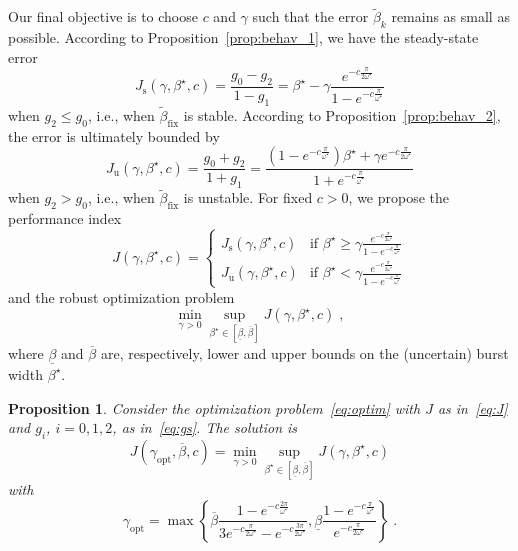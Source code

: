 \documentclass{article}
\newcommand{\rs}{\mathrm{s}}
\newcommand{\ru}{\mathrm{u}}
\newcommand{\opt}{\mathrm{opt}}
\newcommand{\fix}{\mathrm{fix}}
\newtheorem{proposition}{Proposition}
\theoremstyle{definition}
\theoremstyle{remark}
\begin{document}
Our final objective is to choose $c$ and $\gamma$ such that the error $\tilde{\beta}_k$ remains as small as possible. According to Proposition~\ref{prop:behav_1}, we have the steady-state error
\begin{displaymath}
    J_\rs(\gamma,\beta^\star,c) =  \frac{g_0-g_2}{1-g_1} =
      \beta^\star - \gamma\frac{e^{-c\frac{\pi}{2\omega^\star}}}{1 - e^{-c\frac{\pi}{\omega^\star}}}
\end{displaymath}
when $g_2 \le g_0$, i.e., when $\tilde{\beta}_\fix$ is stable. According to Proposition~\ref{prop:behav_2}, the error is ultimately bounded by
\begin{displaymath}
    J_\ru(\gamma,\beta^\star,c) = \frac{g_0+g_2}{1+g_1} =
     \frac{(1 - e^{-c\frac{\pi}{\omega^\star}})\beta^\star + \gamma e^{-c\frac{\pi}{2\omega^\star}}}{1 + e^{-c\frac{\pi}{\omega^\star}}}
\end{displaymath}
when $g_2 > g_0$, i.e., when $\tilde{\beta}_\fix$ is unstable. For fixed $c > 0$, we propose the performance index
\begin{equation} \label{eq:J} 
    J(\gamma,\beta^\star,c) = 
    \begin{cases}
        J_\rs(\gamma,\beta^\star,c) & \text{if $\beta^\star \ge \gamma\frac{e^{-c\frac{\pi}{2\omega^\star}}}{1 - e^{-c\frac{\pi}{\omega^\star}}}$} \\
        J_\ru(\gamma,\beta^\star,c) & \text{if $\beta^\star < \gamma\frac{e^{-c\frac{\pi}{2\omega^\star}}}{1 - e^{-c\frac{\pi}{\omega^\star}}}$}
    \end{cases}
\end{equation}
and the robust optimization problem
\begin{equation} \label{eq:optim}
    \min_{\gamma > 0} \sup_{\beta^\star \in [\underline{\beta}, \overline{\beta}]} J(\gamma,\beta^\star,c) \;,
\end{equation}
where $\underline{\beta}$ and $\overline{\beta}$ are, respectively, lower and upper bounds on the (uncertain) burst width $\beta^\star$.

\begin{proposition} \label{prop:optimization}
    Consider the optimization problem~\eqref{eq:optim} with $J$ as in~\eqref{eq:J} and $g_i$, $i = 0,1,2$, as in~\eqref{eq:gs}. The solution is 
    \begin{displaymath}
        J(\gamma_\opt,\overline{\beta},c) = \min_{\gamma > 0} \sup_{\beta^\star \in [\underline{\beta}, \overline{\beta}]} J(\gamma,\beta^\star,c)
    \end{displaymath}
    with
    \begin{equation} \label{eq:gamma_opt}
        \gamma_{\opt} = \max\left\{\overline{\beta}\frac{1 - e^{-c\frac{2\pi}{\omega^\star}}}{3e^{-c\frac{\pi}{2\omega^\star}} - e^{-c\frac{3\pi}{2\omega^\star}}},\underline{\beta}\frac{1 - e^{-c\frac{\pi}{\omega^\star}}}{e^{-c\frac{\pi}{2\omega^\star}}}\right\} \;.
    \end{equation}
\end{proposition}
\end{document}
